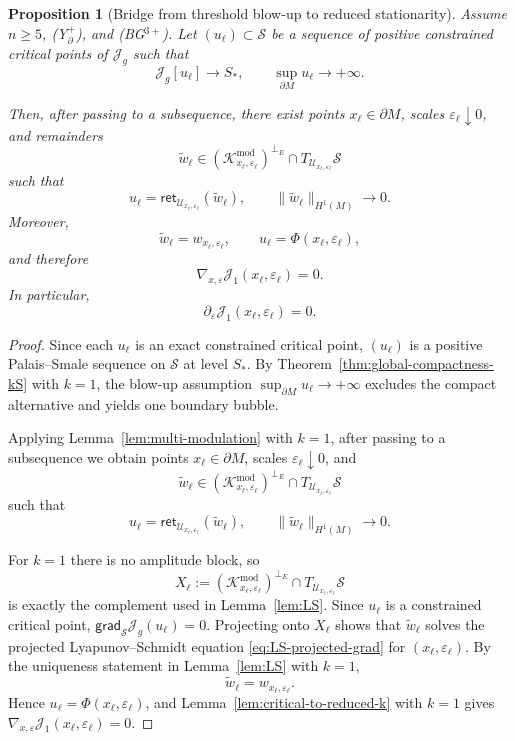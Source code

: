 \documentclass[11pt,reqno,a4paper]{amsart}
\numberwithin{equation}{section}
\theoremstyle{plain}
\newtheorem{proposition}[theorem]{Proposition}
\theoremstyle{remark}
\theoremstyle{plain}
\begin{document}
\begin{proposition}[Bridge from threshold blow-up to reduced stationarity]
\label{prop:isolated-simple-bridge}
Assume $n\ge5$, \textup{(Y$^+_{\partial}$)}, and \textup{(BG$^{3+}$)}.
Let $(u_\ell)\subset\mathcal S$ be a sequence of positive constrained critical points of $\mathcal J_g$
such that
\[
\mathcal J_g[u_\ell]\to S_\ast,
\qquad
\sup_{\partial M}u_\ell\to+\infty.
\]

Then, after passing to a subsequence, there exist points $x_\ell\in\partial M$, scales
$\varepsilon_\ell\downarrow0$, and remainders
\[
\widetilde w_\ell\in
(\mathcal K^{\mathrm{mod}}_{x_\ell,\varepsilon_\ell})^{\perp_E}
\cap T_{\mathcal U_{x_\ell,\varepsilon_\ell}}\mathcal S
\]
such that
\[
u_\ell=\mathsf{ret}_{\mathcal U_{x_\ell,\varepsilon_\ell}}(\widetilde w_\ell),
\qquad
\|\widetilde w_\ell\|_{H^1(M)}\to0.
\]
Moreover,
\[
\widetilde w_\ell=w_{x_\ell,\varepsilon_\ell},
\qquad
u_\ell=\Phi(x_\ell,\varepsilon_\ell),
\]
and therefore
\[
\nabla_{x,\varepsilon}\mathcal J_1(x_\ell,\varepsilon_\ell)=0.
\]
In particular,
\[
\partial_\varepsilon\mathcal J_1(x_\ell,\varepsilon_\ell)=0.
\]
\end{proposition}

\begin{proof}
Since each $u_\ell$ is an exact constrained critical point, $(u_\ell)$ is a positive
Palais--Smale sequence on $\mathcal S$ at level $S_\ast$.
By Theorem~\ref{thm:global-compactness-kS} with $k=1$, the blow-up assumption
$\sup_{\partial M}u_\ell\to+\infty$ excludes the compact alternative and yields one boundary bubble.

Applying Lemma~\ref{lem:multi-modulation} with $k=1$, after passing to a subsequence we obtain
points $x_\ell\in\partial M$, scales $\varepsilon_\ell\downarrow0$, and
\[
\widetilde w_\ell\in
(\mathcal K^{\mathrm{mod}}_{x_\ell,\varepsilon_\ell})^{\perp_E}
\cap T_{\mathcal U_{x_\ell,\varepsilon_\ell}}\mathcal S
\]
such that
\[
u_\ell=\mathsf{ret}_{\mathcal U_{x_\ell,\varepsilon_\ell}}(\widetilde w_\ell),
\qquad
\|\widetilde w_\ell\|_{H^1(M)}\to0.
\]

For $k=1$ there is no amplitude block, so
\[
X_\ell:=
(\mathcal K^{\mathrm{mod}}_{x_\ell,\varepsilon_\ell})^{\perp_E}
\cap T_{\mathcal U_{x_\ell,\varepsilon_\ell}}\mathcal S
\]
is exactly the complement used in Lemma~\ref{lem:LS}.
Since $u_\ell$ is a constrained critical point,
$\mathsf{grad}_{\mathcal S}\mathcal J_g(u_\ell)=0$.
Projecting onto $X_\ell$ shows that $\widetilde w_\ell$ solves the projected
Lyapunov--Schmidt equation \eqref{eq:LS-projected-grad} for $(x_\ell,\varepsilon_\ell)$.
By the uniqueness statement in Lemma~\ref{lem:LS} with $k=1$,
\[
\widetilde w_\ell=w_{x_\ell,\varepsilon_\ell}.
\]
Hence $u_\ell=\Phi(x_\ell,\varepsilon_\ell)$, and Lemma~\ref{lem:critical-to-reduced-k}
with $k=1$ gives $
\nabla_{x,\varepsilon}\mathcal J_1(x_\ell,\varepsilon_\ell)=0$.
\end{proof}
\end{document}
